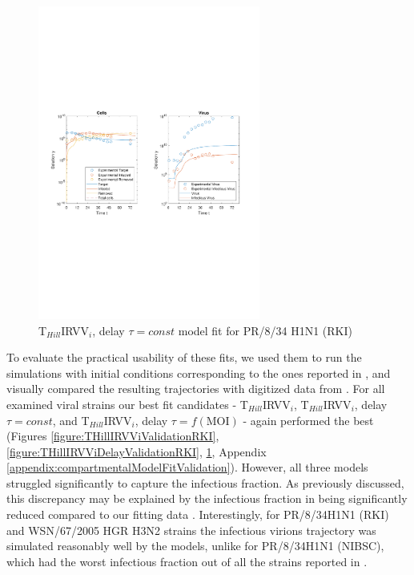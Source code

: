 \begin{figure}[H]
\begin{center}
\includegraphics[width=0.65\textwidth, trim={1cm 9.8cm 1cm 9.5cm}, clip]{D_chapters/6_appendix/4_ValidationRKI/InfectionDepletionModelTHillIRVViDelayFitTauMOI0.025log.pdf}
\caption[T$_{Hill}$IRVV$_i$, delay $\tau = const$ model fit for PR/8/34 H1N1 (RKI)]%
{T$_{Hill}$IRVV$_i$, delay $\tau = const$ model fit for PR/8/34 H1N1 (RKI)}
\label{figure:THillIRVViDelayFitTauValidationRKI}
\end{center}
\end{figure}

To evaluate the practical usability of these fits, we used them to run the simulations with initial conditions corresponding to the ones reported in \cite{schulze2009infection}, and visually compared the resulting trajectories with digitized data from \cite{schulze2009infection}. For all examined viral strains our best fit candidates - T$_{Hill}$IRVV$_i$, T$_{Hill}$IRVV$_i$, delay $\tau = const$, and T$_{Hill}$IRVV$_i$, delay $\tau = f(\text{MOI})$ - again performed the best (Figures \ref{figure:THillIRVViValidationRKI}, \ref{figure:THillIRVViDelayValidationRKI}, \ref{figure:THillIRVViDelayFitTauValidationRKI}, Appendix \ref{appendix:compartmentalModelFitValidation}). However, all three models struggled significantly to capture the infectious fraction. As previously discussed, this discrepancy may be explained by the infectious fraction in \cite{schulze2009infection} being significantly reduced compared to our fitting data \cite{rudiger2019multiscale}. Interestingly, for PR/8/34H1N1 (RKI) and WSN/67/2005 HGR H3N2 strains the infectious virions trajectory was simulated reasonably well by the models, unlike for PR/8/34H1N1 (NIBSC), which had the worst infectious fraction out of all the strains reported in \cite{schulze2009infection}.

